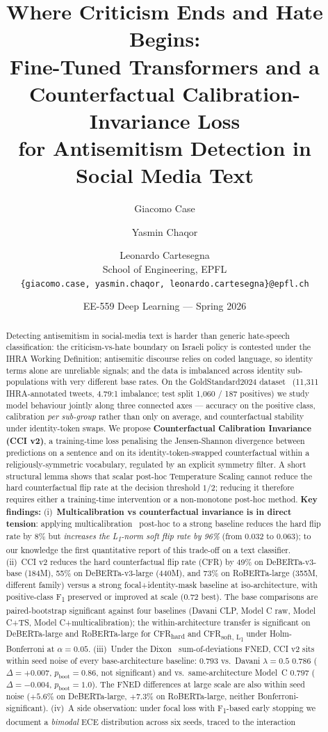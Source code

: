 \documentclass[10pt,a4paper]{article}
\title{Where Criticism Ends and Hate Begins:\\
Fine-Tuned Transformers and a Counterfactual Calibration-Invariance Loss\\
for Antisemitism Detection in Social Media Text}
\author{
  Giacomo Case \and Yasmin Chaqor \and Leonardo Cartesegna\\
  School of Engineering, EPFL\\
  \texttt{\{giacomo.case, yasmin.chaqor, leonardo.cartesegna\}@epfl.ch}
}
\date{EE-559 Deep Learning --- Spring 2026}
\begin{document}
\maketitle

\begin{abstract}
Detecting antisemitism in social-media text is harder than generic hate-speech classification: the criticism-vs-hate boundary on Israeli policy is contested under the IHRA Working Definition; antisemitic discourse relies on coded language, so identity terms alone are unreliable signals; and the data is imbalanced across identity sub-populations with very different base rates. On the GoldStandard2024 dataset~\citep{jikeli2024goldstandard} (11{,}311 IHRA-annotated tweets, 4.79:1 imbalance; test split 1{,}060 / 187 positives) we study model behaviour jointly along three connected axes --- accuracy on the positive class, calibration \emph{per sub-group} rather than only on average, and counterfactual stability under identity-token swaps. We propose \textbf{Counterfactual Calibration Invariance (CCI v2)}, a training-time loss penalising the Jensen-Shannon divergence between predictions on a sentence and on its identity-token-swapped counterfactual within a religiously-symmetric vocabulary, regulated by an explicit symmetry filter. A short structural lemma shows that scalar post-hoc Temperature Scaling cannot reduce the hard counterfactual flip rate at the decision threshold $1/2$; reducing it therefore requires either a training-time intervention or a non-monotone post-hoc method. \textbf{Key findings:} (i)~\textbf{Multicalibration vs counterfactual invariance is in direct tension}: applying multicalibration~\citep{hebertjohnson2018multicalibration} post-hoc to a strong baseline reduces the hard flip rate by 8\% but \emph{increases the L\textsubscript{1}-norm soft flip rate by 96\%} (from 0.032 to 0.063); to our knowledge the first quantitative report of this trade-off on a text classifier. (ii)~CCI v2 reduces the hard counterfactual flip rate (CFR) by 49\% on DeBERTa-v3-base (184M), 55\% on DeBERTa-v3-large (440M), and 73\% on RoBERTa-large (355M, different family) versus a strong focal+identity-mask baseline at iso-architecture, with positive-class F\textsubscript{1} preserved or improved at scale (0.72 best). The base comparisons are paired-bootstrap significant against four baselines (Davani CLP, Model C raw, Model C+TS, Model C+multicalibration); the within-architecture transfer is significant on DeBERTa-large and RoBERTa-large for CFR\textsubscript{hard} and CFR\textsubscript{soft, L\textsubscript{1}} under Holm-Bonferroni at $\alpha = 0.05$. (iii)~Under the Dixon~\citep{dixon2018measuring} sum-of-deviations FNED, CCI v2 sits within seed noise of every base-architecture baseline: $0.793$ vs.\ Davani $\lambda=0.5$ $0.786$ ($\Delta=+0.007$, $p_{\text{boot}}=0.86$, not significant) and vs.\ same-architecture Model~C $0.797$ ($\Delta=-0.004$, $p_{\text{boot}}=1.0$). The FNED differences at large scale are also within seed noise ($+5.6\%$ on DeBERTa-large, $+7.3\%$ on RoBERTa-large, neither Bonferroni-significant). (iv)~A side observation: under focal loss with F\textsubscript{1}-based early stopping we document a \emph{bimodal} ECE distribution across six seeds, traced to the interaction 
\end{abstract}
\end{document}
